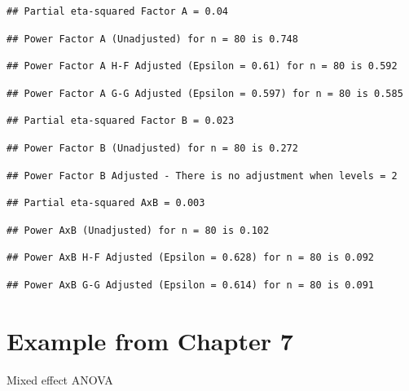 \documentclass[]{book}
\begin{document}
\begin{verbatim}
## Partial eta-squared Factor A = 0.04
\end{verbatim}

\begin{verbatim}
## Power Factor A (Unadjusted) for n = 80 is 0.748
\end{verbatim}

\begin{verbatim}
## Power Factor A H-F Adjusted (Epsilon = 0.61) for n = 80 is 0.592
\end{verbatim}

\begin{verbatim}
## Power Factor A G-G Adjusted (Epsilon = 0.597) for n = 80 is 0.585
\end{verbatim}

\begin{verbatim}
## Partial eta-squared Factor B = 0.023
\end{verbatim}

\begin{verbatim}
## Power Factor B (Unadjusted) for n = 80 is 0.272
\end{verbatim}

\begin{verbatim}
## Power Factor B Adjusted - There is no adjustment when levels = 2
\end{verbatim}

\begin{verbatim}
## Partial eta-squared AxB = 0.003
\end{verbatim}

\begin{verbatim}
## Power AxB (Unadjusted) for n = 80 is 0.102
\end{verbatim}

\begin{verbatim}
## Power AxB H-F Adjusted (Epsilon = 0.628) for n = 80 is 0.092
\end{verbatim}

\begin{verbatim}
## Power AxB G-G Adjusted (Epsilon = 0.614) for n = 80 is 0.091
\end{verbatim}

\hypertarget{example-from-chapter-7}{%
\section{Example from Chapter 7}\label{example-from-chapter-7}}

Mixed effect ANOVA
\end{document}

